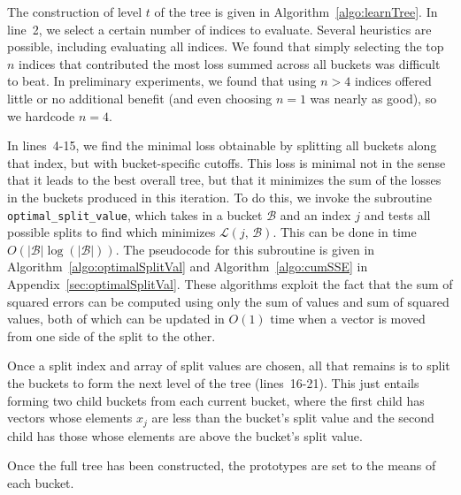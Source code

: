 The construction of level $t$ of the tree is given in Algorithm~\ref{algo:learnTree}.
In line~2, we select a certain number of indices to evaluate. Several heuristics are possible, including evaluating all indices. We found that simply selecting the top $n$ indices that contributed the most loss summed across all buckets was difficult to beat. In preliminary experiments, we found that using $n > 4$ indices offered little or no additional benefit (and even choosing $n = 1$ was nearly as good), so we hardcode $n = 4$.

In lines~4-15, we find the minimal loss obtainable by splitting all buckets along that index, but with bucket-specific cutoffs. This loss is minimal not in the sense that it leads to the best overall tree, but that it minimizes the sum of the losses in the buckets produced in this iteration. To do this, we invoke the subroutine \texttt{optimal\_split\_value}, which takes in a bucket $\mathcal{B}$ and an index $j$ and tests all possible splits to find which minimizes $\mathcal{L}(j \text{, } \mathcal{B})$. This can be done in time $O(|\mathcal{B}| \log(|\mathcal{B}|))$. The pseudocode for this subroutine is given in Algorithm~\ref{algo:optimalSplitVal} and Algorithm~\ref{algo:cumSSE} in Appendix~\ref{sec:optimalSplitVal}. These algorithms exploit the fact that the sum of squared errors can be computed using only the sum of values and sum of squared values, both of which can be updated in $O(1)$ time when a vector is moved from one side of the split to the other.

Once a split index and array of split values are chosen, all that remains is to split the buckets to form the next level of the tree (lines~16-21). This just entails forming two child buckets from each current bucket, where the first child has vectors whose elements $x_j$ are less than the bucket's split value and the second child has those whose elements are above the bucket's split value.

Once the full tree has been constructed, the prototypes are set to the means of each bucket.

